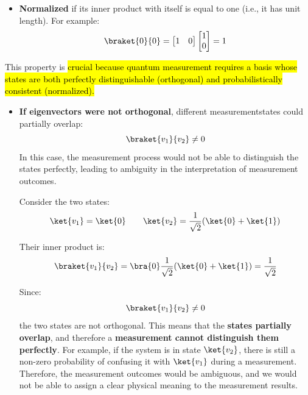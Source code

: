 \begin{enumerate}
\begin{itemize}
        \item \textbf{Normalized} if its inner product with itself is equal to one (i.e., it has unit length). For example:
        \begin{equation*}
            \braket{0}{0}
            =
            \begin{bmatrix}
                1 & 0
            \end{bmatrix}
            \begin{bmatrix}
                1 \\
                0
            \end{bmatrix}
            = 1
        \end{equation*}
    \end{itemize}

    This property is \hl{crucial because quantum measurement requires a basis whose states are both perfectly distinguishable (orthogonal) and probabilistically consistent (normalized).}
    \begin{itemize}
        \item[\textcolor{Red2}{\faIcon{times}}] \textbf{If eigenvectors were not orthogonal}, different measurement\break states could partially overlap:
        \begin{equation*}
            \braket{v_1}{v_2} \neq 0
        \end{equation*}
        In this case, the measurement process would not be able to distinguish the states perfectly, leading to ambiguity in the interpretation of measurement outcomes.
        \begin{examplebox}
            Consider the two states:
            \begin{equation*}
                \ket{v_1} = \ket{0}
                \qquad
                \ket{v_2} = \frac{1}{\sqrt{2}}(\ket{0} + \ket{1})
            \end{equation*}

            Their inner product is:
            \begin{equation*}
                \braket{v_1}{v_2}
                =
                \bra{0}
                \frac{1}{\sqrt{2}}(\ket{0} + \ket{1})
                =
                \frac{1}{\sqrt{2}}
            \end{equation*}

            Since:
            \begin{equation*}
                \braket{v_1}{v_2} \neq 0
            \end{equation*}
            the two states are not orthogonal. This means that the \textbf{states partially overlap}, and therefore a \textbf{measurement cannot distinguish them perfectly}. For example, if the system is in state $\ket{v_2}$, there is still a non-zero probability of confusing it with $\ket{v_1}$ during a measurement. Therefore, the measurement outcomes would be ambiguous, and we would not be able to assign a clear physical meaning to the measurement results.
        \end{examplebox}


\end{itemize}
\end{enumerate}
